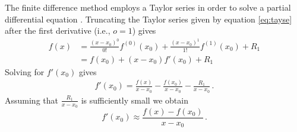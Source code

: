 The finite difference method employs a Taylor series in order to solve a partial differential equation \parencite{fornberg_finite_2011}.  Truncating the Taylor series given by equation \eqref{eq:tayse} after the first derivative (i.e., $o = 1$) gives
\begin{align*}
  f(x) &= \frac{(x - x_0)^0}{0!}f^{(0)}(x_0) + \frac{(x - x_0)^1}{1!}f^{(1)}(x_0) + R_1 \\
       &= f(x_0) + (x - x_0)f'(x_0) + R_1
\end{align*}
Solving for $f'(x_0)$ gives
\begin{align*}
  f'(x_0) = \frac{f(x)}{x - x_0} - \frac{f(x_0)}{x - x_0} - \frac{R_1}{x - x_0} \, .
\end{align*}
Assuming that $\frac{R_1}{x - x_0}$ is sufficiently small we obtain
\begin{equation}
  \label{eq:fidifmeth}
  f'(x_0) \approx \frac{f(x) - f(x_0)}{x - x_0} \, .
\end{equation}

